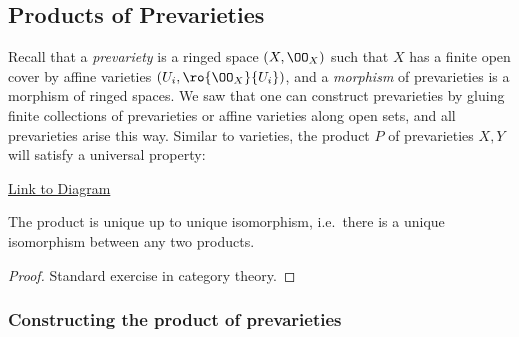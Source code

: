 \hypertarget{products-of-prevarieties}{%
\subsection{Products of Prevarieties}\label{products-of-prevarieties}}

Recall that a \emph{prevariety} is a ringed space \((X, \OO_X)\) such
that \(X\) has a finite open cover by affine varieties
\((U_i, \ro{\OO_X}{U_i})\), and a \emph{morphism} of prevarieties is a
morphism of ringed spaces. We saw that one can construct prevarieties by
gluing finite collections of prevarieties or affine varieties along open
sets, and all prevarieties arise this way. Similar to varieties, the
product \(P\) of prevarieties \(X, Y\) will satisfy a universal
property:

\begin{center}
\end{center}

\href{https://tikzcd.yichuanshen.de/\#N4Igdg9gJgpgziAXAbVABwnAlgFyxMJZABgBpiBdUkANwEMAbAVxiRAAUQBfU9TXfIRQBGUsKq1GLNgC1uvEBmx4CRAExiJ9Zq0QgAGvL7LBRUWq1TdIAJrcJMKAHN4RUADMAThAC2SUSA4EEgAzDwe3n6IAUFIauEgXr7+1LGIZCAMWGDWUHRwABaOINTa0noAOhUwAB5YcDgICUlRGWkaIABGMGBQoRll1lVoWAD6hs2RSG3BiCHU3b1IALQhA1Zsw2N21Ax03Qzs-CpCIJ5YTgU49lxAA}{Link
to Diagram}

\begin{proposition}[?]

The product is unique up to unique isomorphism, i.e.~there is a unique
isomorphism between any two products.

\end{proposition}

\begin{proof}

Standard exercise in category theory.

\end{proof}

\hypertarget{constructing-the-product-of-prevarieties}{%
\subsubsection{Constructing the product of
prevarieties}\label{constructing-the-product-of-prevarieties}}

